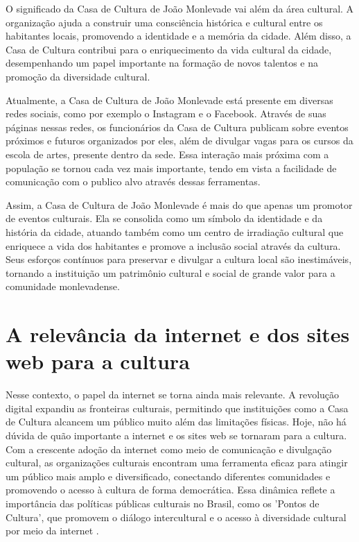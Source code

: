 O significado da Casa de Cultura de João Monlevade vai além da área cultural. A organização ajuda a construir uma consciência histórica e cultural entre os habitantes locais, promovendo a identidade e a memória da cidade. Além disso, a Casa de Cultura contribui para o enriquecimento da vida cultural da cidade, desempenhando um papel importante na formação de novos talentos e na promoção da diversidade cultural.

Atualmente, a Casa de Cultura de João Monlevade está presente em diversas redes sociais, como por exemplo o Instagram e o Facebook. Através de suas páginas nessas redes, os funcionários da Casa de Cultura publicam sobre eventos próximos e futuros organizados por eles, além de divulgar vagas para os cursos da escola de artes, presente dentro da sede. Essa interação mais próxima com a população se tornou cada vez mais importante, tendo em vista a facilidade de comunicação com o publico alvo através dessas ferramentas.

Assim, a Casa de Cultura de João Monlevade é mais do que apenas um promotor de eventos culturais. Ela se consolida como um símbolo da identidade e da história da cidade, atuando também como um centro de irradiação cultural que enriquece a vida dos habitantes e promove a inclusão social através da cultura. Seus esforços contínuos para preservar e divulgar a cultura local são inestimáveis, tornando a instituição um patrimônio cultural e social de grande valor para a comunidade monlevadense.


\section{A relevância da internet e dos sites web para a cultura}

Nesse contexto, o papel da internet se torna ainda mais relevante. A revolução digital expandiu as fronteiras culturais, permitindo que instituições como a Casa de Cultura alcancem um público muito além das limitações físicas. Hoje, não há dúvida de quão importante a internet e os sites web se tornaram para a cultura. Com a crescente adoção da internet como meio de comunicação e divulgação cultural, as organizações culturais encontram uma ferramenta eficaz para atingir um público mais amplo e diversificado, conectando diferentes comunidades e promovendo o acesso à cultura de forma democrática. Essa dinâmica reflete a importância das políticas públicas culturais no Brasil, como os 'Pontos de Cultura', que promovem o diálogo intercultural e o acesso à diversidade cultural por meio da internet \cite{costa2011}.

